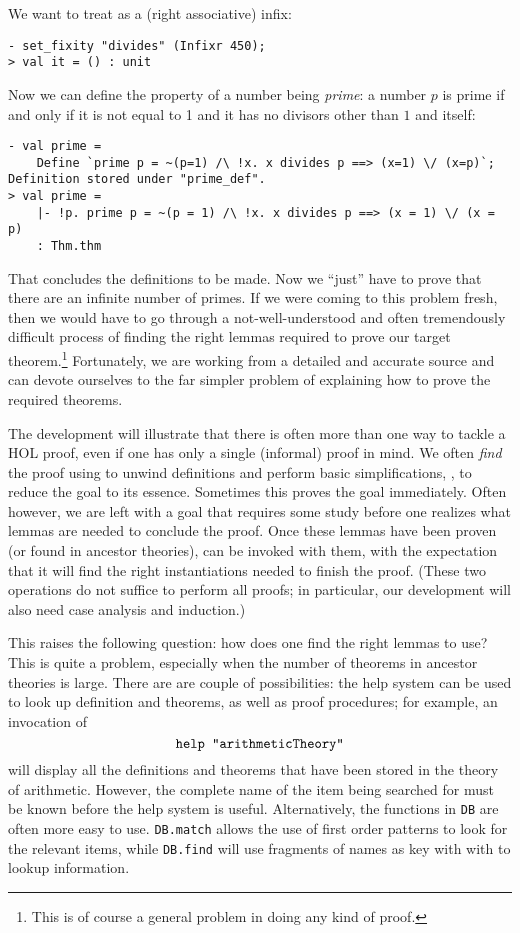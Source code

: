 We want to treat  as a (right associative) infix:
\begin{session}\begin{verbatim}
- set_fixity "divides" (Infixr 450);
> val it = () : unit
\end{verbatim}\end{session}
Now we can define the property of a number being {\it prime}: a number $p$ is
prime if and only if it is not equal to 1 and it has no divisors other
than $1$ and itself:

\begin{session}\begin{verbatim}
- val prime =
    Define `prime p = ~(p=1) /\ !x. x divides p ==> (x=1) \/ (x=p)`;
Definition stored under "prime_def".
> val prime =
    |- !p. prime p = ~(p = 1) /\ !x. x divides p ==> (x = 1) \/ (x = p)
    : Thm.thm
\end{verbatim}\end{session}

That concludes the definitions to be made. Now we ``just'' have to prove
that there are an infinite number of primes. If we were coming to this
problem fresh, then we would have to go through a not-well-understood
and often tremendously difficult process of finding the right lemmas
required to prove our target theorem.\footnote{This is of course a
general problem in doing any kind of proof.} Fortunately, we are working
from a detailed and accurate source and can devote ourselves to the far
simpler problem of explaining how to prove the required theorems.

The development will illustrate that there is often more than one way to
tackle a HOL proof, even if one has only a single (informal) proof in
mind. We often {\it find\/} the proof using  to unwind
definitions and perform basic simplifications, \ie, to reduce the goal
to its essence. Sometimes this proves the goal immediately. Often
however, we are left with a goal that requires some study before one
realizes what lemmas are needed to conclude the proof. Once these lemmas
have been proven (or found in ancestor theories),  can
be invoked with them, with the expectation that it will find the right
instantiations needed to finish the proof. (These two operations do not
suffice to perform all proofs; in particular, our development will also need
case analysis and induction.)

This raises the following question: how does one find the right lemmas
to use? This is quite a problem, especially when the number of
theorems in ancestor theories is large. There are are couple of
possibilities: the help system can be used to look up definition and
theorems, as well as proof procedures; for example, an invocation of
\[
\mbox{\texttt{help "arithmeticTheory"}}
\]
will display all the definitions and theorems that have been stored in
the theory of arithmetic. However, the complete name of the item being
searched for must be known before the help system is useful.
Alternatively, the functions in \verb+DB+ are often more easy to use.
\verb+DB.match+ allows the use of first order patterns to look for the
relevant items, while \verb+DB.find+ will use fragments of names as
key with with to lookup information.

